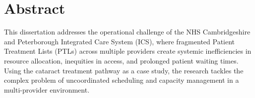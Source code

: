 \documentclass[ %
                    author={Nattanan Nawakitbamrung},
                supervisor={Dr. Sébastien Rochat},
                    degree={MSc},
                     title={Developing and Evaluating the Impact of a Single Patient Treatment List (PTL) for an NHS Integrated Care System},
                  subtitle={},
                      type={},
                      year={2025}]{dissertation}
\begin{document}





\maketitle


\frontmatter


\makedecl


\tableofcontents
\listoffigures
\listoftables
\listofalgorithms



\chapter*{Abstract}
\noindent
This dissertation addresses the operational challenge of the NHS Cambridgeshire and Peterborough Integrated Care System (ICS), where fragmented Patient Treatment Lists (PTLs) across multiple providers create systemic inefficiencies in resource allocation, inequities in access, and prolonged patient waiting times. Using the cataract treatment pathway as a case study, the research tackles the complex problem of uncoordinated scheduling and capacity management in a multi-provider environment.
\end{document}
